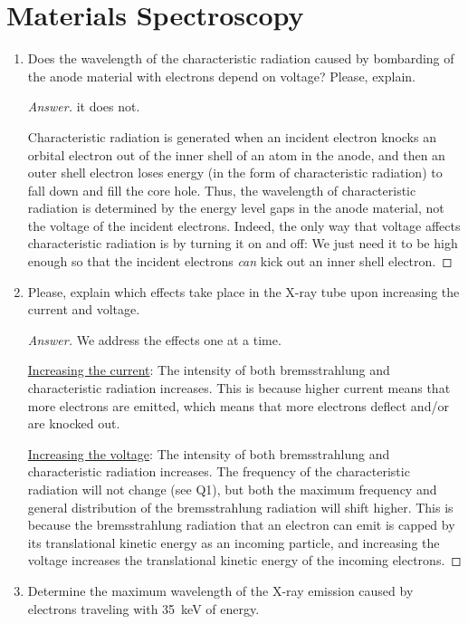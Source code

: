 \documentclass[../psets.tex]{subfiles}
\begin{document}
\section{Materials Spectroscopy}
\begin{enumerate}
    \item {}Does the wavelength of the characteristic radiation caused by bombarding of the anode material with electrons depend on voltage? Please, explain.
    \begin{proof}[Answer]
         it does not.\par
        Characteristic radiation is generated when an incident electron knocks an orbital electron out of the inner shell of an atom in the anode, and then an outer shell electron loses energy (in the form of characteristic radiation) to fall down and fill the core hole. Thus, the wavelength of characteristic radiation is determined by the energy level gaps in the anode material, not the voltage of the incident electrons. Indeed, the only way that voltage affects characteristic radiation is by turning it on and off: We just need it to be high enough so that the incident electrons \emph{can} kick out an inner shell electron.
    \end{proof}
    \item Please, explain which effects take place in the X-ray tube upon increasing the current and voltage.
    \begin{proof}[Answer]
        We address the effects one at a time.\par\smallskip
        \underline{Increasing the current}: The intensity of both bremsstrahlung and characteristic radiation increases. This is because higher current means that more electrons are emitted, which means that more electrons deflect and/or are knocked out.\par
        \underline{Increasing the voltage}: The intensity of both bremsstrahlung and characteristic radiation increases. The frequency of the characteristic radiation will not change (see Q1), but both the maximum frequency and general distribution of the bremsstrahlung radiation will shift higher. This is because the bremsstrahlung radiation that an electron can emit is capped by its translational kinetic energy as an incoming particle, and increasing the voltage increases the translational kinetic energy of the incoming electrons.
    \end{proof}
    \item Determine the maximum wavelength of the X-ray emission caused by electrons traveling with \SI{35}{\kilo\electronvolt} of energy.

\end{enumerate}
\end{document}
